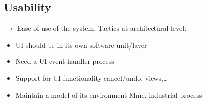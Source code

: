 \subsection{Usability}
$\rightarrow$ Ease of use of the system.
Tactics at architectural level:
\begin{itemize}
    \item UI should be in its own software unit/layer
    \item Need a UI event handler process
    \item Support for UI functionality cancel/undo, views,\ldots
    \item Maintain a model of its environment Mme, industrial process
\end{itemize}
